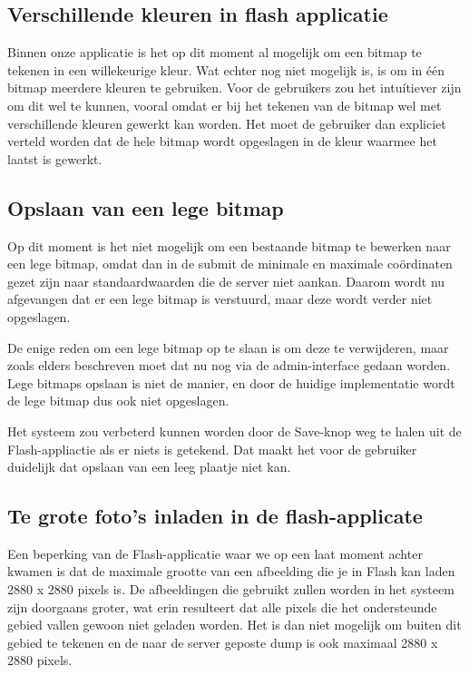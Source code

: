 \subsection{Verschillende kleuren in flash applicatie} %
Binnen onze applicatie is het op dit moment al mogelijk om een bitmap te tekenen in een willekeurige kleur. 
Wat echter nog niet mogelijk is, is om in \'{e}\'{e}n bitmap meerdere kleuren te gebruiken.
Voor de gebruikers zou het intu\'{i}tiever zijn om dit wel te kunnen, vooral omdat er bij het tekenen van de bitmap wel met verschillende kleuren gewerkt kan worden.
Het moet de gebruiker dan expliciet verteld worden dat de hele bitmap wordt opgeslagen in de kleur waarmee het laatst is gewerkt.


\subsection{Opslaan van een lege bitmap} %
Op dit moment is het niet mogelijk om een bestaande bitmap te bewerken naar een lege bitmap, omdat dan in de submit de minimale en maximale co\"ordinaten gezet zijn naar standaardwaarden die de server niet aankan. Daarom wordt nu afgevangen dat er een lege bitmap is verstuurd, maar deze wordt verder niet opgeslagen.

De enige reden om een lege bitmap op te slaan is om deze te verwijderen, maar zoals elders beschreven moet dat nu nog via de admin-interface gedaan worden. Lege bitmaps opslaan is niet de manier, en door de huidige implementatie wordt de lege bitmap dus ook niet opgeslagen.

Het systeem zou verbeterd kunnen worden door de Save-knop weg te halen uit de Flash-appliactie als er niets is getekend. Dat maakt het voor de gebruiker duidelijk dat opslaan van een leeg plaatje niet kan.

\subsection{Te grote foto's inladen in de flash-applicate} %
Een beperking van de Flash-applicatie waar we op een laat moment achter kwamen is dat de maximale grootte van een afbeelding die je in Flash kan laden 2880 x 2880 pixels is. De afbeeldingen die gebruikt zullen worden in het systeem zijn doorgaans groter, wat erin resulteert dat alle pixels die het ondersteunde gebied vallen gewoon niet geladen worden. Het is dan niet mogelijk om buiten dit gebied te tekenen en de naar de server geposte dump is ook maximaal 2880 x 2880 pixels.

